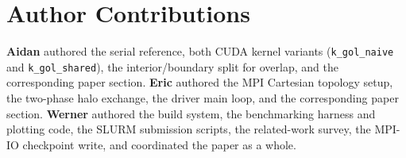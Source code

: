 \documentclass[sigconf,nonacm,10pt]{acmart}
\begin{document}
\section*{Author Contributions}

\textbf{Aidan} authored the serial reference, both CUDA kernel
variants (\texttt{k\_gol\_naive} and \texttt{k\_gol\_shared}), the
interior/boundary split for overlap, and the corresponding paper
section. \textbf{Eric} authored the MPI Cartesian topology setup, the
two-phase halo exchange, the driver main loop, and the corresponding
paper section. \textbf{Werner} authored the build system, the
benchmarking harness and plotting code, the SLURM submission scripts,
the related-work survey, the MPI-IO checkpoint write, and coordinated
the paper as a whole.



\end{document}
